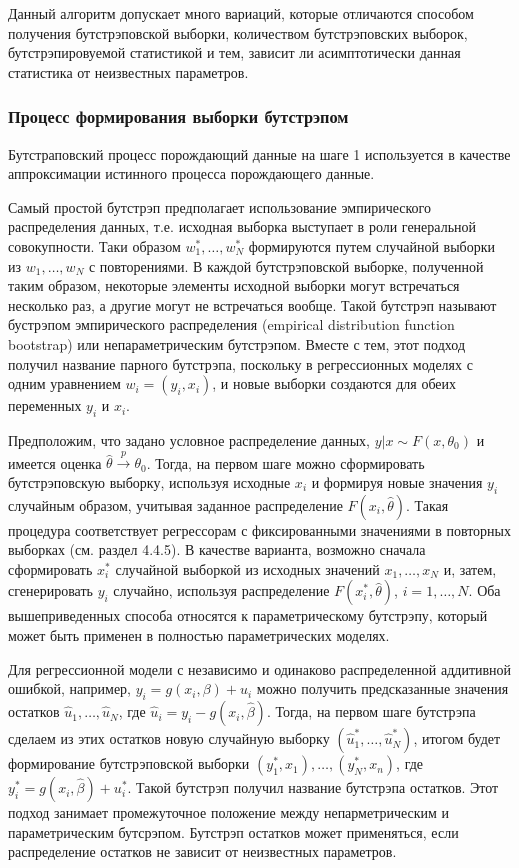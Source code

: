 Данный алгоритм допускает много вариаций, которые отличаются способом получения бутстрэповской выборки, количеством бутстрэповских выборок, бутстрэпировуемой статистикой и тем, зависит ли асимптотически данная статистика  от неизвестных параметров.


\subsubsection*{Процесс формирования выборки бутстрэпом}


Бутстраповский процесс порождающий данные на шаге 1 используется в качестве аппроксимации истинного процесса порождающего данные.

Самый простой бутстрэп предполагает использование эмпирического распределения данных, т.е. исходная выборка выступает в роли генеральной совокупности. Таки образом $w_1^*,\ldots ,w_N^*$ формируются путем случайной выборки из  $w_1,\ldots ,w_N$ с повторениями. В каждой бутстрэповской выборке, полученной таким образом, некоторые элементы исходной выборки могут встречаться несколько раз, а другие могут не встречаться вообще. Такой бутстрэп называют бустрэпом эмпирического распределения (empirical distribution function bootstrap) или непараметрическим бутстрэпом. Вместе с тем, этот подход получил название парного бутстрэпа, поскольку в регрессионных моделях с одним уравнением $w_i=(y_i,x_i)$, и новые выборки создаются для обеих переменных $y_i$ и $x_i$. 

Предположим, что задано условное распределение данных, $y|x\sim F(x,\theta_0)$ и имеется оценка $\hat{\theta} \stackrel{p}{\rightarrow} \theta_0$. Тогда, на первом шаге можно сформировать бутстрэповскую выборку, используя исходные $x_i$ и формируя новые значения $y_i$ случайным образом, учитывая заданное распределение $F(x_i,\hat{\theta})$. Такая процедура соответствует регрессорам с фиксированными значениями в повторных выборках (см. раздел 4.4.5). В качестве варианта, возможно сначала сформировать $x_i^*$ случайной выборкой из исходных значений $x_1,\ldots, x_N$ и, затем, сгенерировать $y_i$ случайно, используя распределение $F(x_i^*,\hat{\theta})$, $i=1,\ldots, N$. Оба вышеприведенных способа относятся к параметрическому бутстрэпу, который может быть применен в полностью  параметрических моделях.


Для регрессионной модели с независимо и одинаково распределенной аддитивной ошибкой, например, $y_i=g(x_i,\beta)+u_i$ можно получить предсказанные значения остатков $\hat{u}_1,\ldots ,\hat{u}_N$, где $\hat{u}_i=y_i-g(x_i,\hat{\beta})$. Тогда, на первом шаге бутстрэпа сделаем из этих остатков новую случайную выборку $(\hat{u}_1^*,\ldots ,\hat{u}_N^*)$, итогом будет формирование бутстрэповской выборки $(y_1^*,x_1),\ldots,(y_N^*,x_n)$, где $y_i^*=g(x_i,\hat{\beta})+u_i^*$. Такой бутстрэп получил название бутстрэпа остатков. Этот подход занимает промежуточное положение между непарметрическим и параметрическим бутсрэпом. Бутстрэп остатков может применяться, если распределение остатков не зависит от неизвестных параметров.

